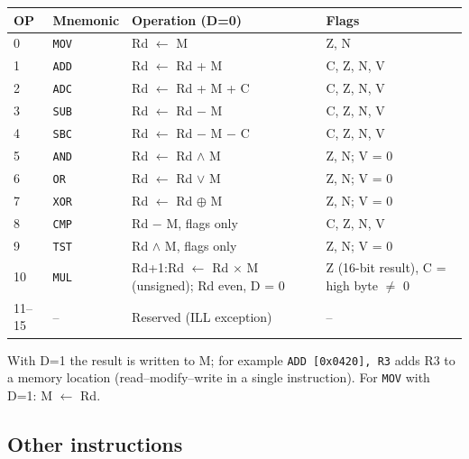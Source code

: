 \begin{center}
\small
\begin{tabularx}{\linewidth}{@{}l l X l@{}}
  \toprule
  \textbf{OP} & \textbf{Mnemonic} & \textbf{Operation (D=0)} & \textbf{Flags} \\
  \midrule
  0  & \texttt{MOV} & Rd $\leftarrow$ M                         & Z, N \\
  1  & \texttt{ADD} & Rd $\leftarrow$ Rd + M                    & C, Z, N, V \\
  2  & \texttt{ADC} & Rd $\leftarrow$ Rd + M + C                & C, Z, N, V \\
  3  & \texttt{SUB} & Rd $\leftarrow$ Rd $-$ M                  & C, Z, N, V \\
  4  & \texttt{SBC} & Rd $\leftarrow$ Rd $-$ M $-$ C            & C, Z, N, V \\
  5  & \texttt{AND} & Rd $\leftarrow$ Rd $\wedge$ M             & Z, N; V = 0 \\
  6  & \texttt{OR}  & Rd $\leftarrow$ Rd $\vee$ M               & Z, N; V = 0 \\
  7  & \texttt{XOR} & Rd $\leftarrow$ Rd $\oplus$ M             & Z, N; V = 0 \\
  8  & \texttt{CMP} & Rd $-$ M, flags only                      & C, Z, N, V \\
  9  & \texttt{TST} & Rd $\wedge$ M, flags only                 & Z, N; V = 0 \\
  10 & \texttt{MUL} & Rd+1:Rd $\leftarrow$ Rd $\times$ M (unsigned); Rd even, D = 0 & Z (16-bit result), C = high byte $\neq$ 0 \\
  11--15 & -- & Reserved (ILL exception) & -- \\
  \bottomrule
\end{tabularx}
\end{center}

With D=1 the result is written to M; for example \texttt{ADD [0x0420], R3}
adds R3 to a memory location (read--modify--write in a single instruction).
For \texttt{MOV} with D=1: M $\leftarrow$ Rd.

\subsection{Other instructions}

